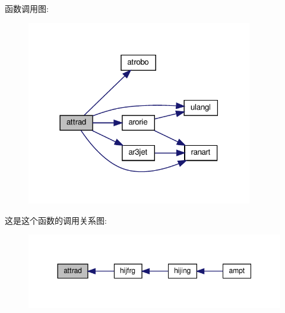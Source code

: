 函数调用图\+:
\nopagebreak
\begin{figure}[H]
\begin{center}
\leavevmode
\includegraphics[width=279pt]{attrad_8f90_a4fa1f1b692c675790ac5e649a5729a24_cgraph}
\end{center}
\end{figure}
这是这个函数的调用关系图\+:
\nopagebreak
\begin{figure}[H]
\begin{center}
\leavevmode
\includegraphics[width=344pt]{attrad_8f90_a4fa1f1b692c675790ac5e649a5729a24_icgraph}
\end{center}
\end{figure}

